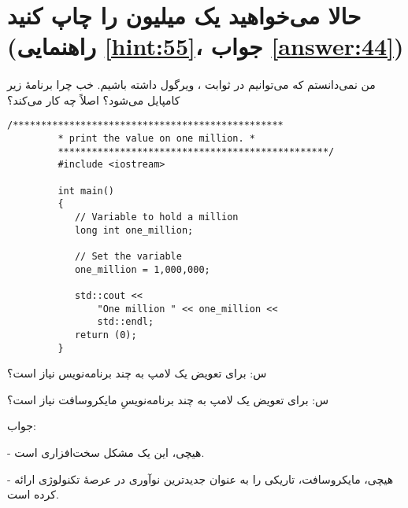 \section[حالا می‌خواهید یک میلیون را چاپ کنید]{حالا می‌خواهید یک میلیون را چاپ کنید \protect{} (راهنمایی \ref{hint:55}، جواب \ref{answer:44})}
\paragraph{}\label{prog:35}
من نمی‌دانستم که می‌توانیم در ثوابت ، ویرگول داشته باشیم. خب چرا برنامهٔ زیر کامپایل می‌شود؟ اصلاً چه کار می‌کند؟

\begin{LTR}
    \begin{lstlisting}[style=C++Style]
         /************************************************
         * print the value on one million. *
         ************************************************/
         #include <iostream>

         int main()
         {
         	// Variable to hold a million
         	long int one_million;

         	// Set the variable
         	one_million = 1,000,000;

         	std::cout <<
         		"One million " << one_million <<
         		std::endl;
         	return (0);
         }
    \end{lstlisting}
\end{LTR}

\begin{tcolorbox}
    س: برای تعویض یک لامپ به چند برنامه‌نویس نیاز است؟

    س: برای تعویض یک لامپ به چند برنامه‌نویسِ مایکروسافت نیاز است؟

    جواب:

    - هیچی، این یک مشکل سخت‌افزاری است.

    - هیچی، مایکروسافت، تاریکی را به عنوان جدیدترین نوآوری در عرصهٔ تکنولوژی ارائه کرده است.
\end{tcolorbox}